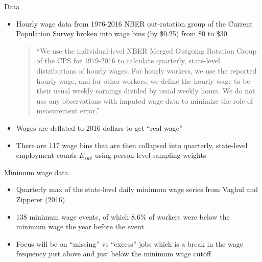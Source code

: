 \documentclass{beamer}
\begin{document}
\begin{frame}{Data}

\begin{itemize}
\item Hourly wage data from 1976-2016 NBER out-rotation group of the Current Population Survey broken into wage bins (by \$0.25) from \$0 to \$30
\begin{quote}
``We use the individual-level NBER Merged Outgoing Rotation Group of the CPS for 1979-2016 to calculate quarterly, state-level distributions of hourly wages. For hourly workers, we use the reported hourly wage, and for other workers, we define the hourly wage to be their usual weekly earnings divided by usual weekly hours.  We do not use any observations with imputed wage data to minimize the role of measurement error.''
\end{quote}
\item Wages are deflated to 2016 dollars to get ``real wage''
\item There are 117 wage bins that are then collapsed into quarterly, state-level employment counts $E_{swt}$ using person-level sampling weights
\end{itemize}

\end{frame}

\begin{frame}{Minimum wage data}

\begin{itemize}
\item Quarterly max of the state-level daily minimum wage series from Vaghul and Zipperer (2016)
\item 138 minimum wage events, of which 8.6\% of workers were below the minimum wage the year before the event
\item Focus will be on ``missing'' vs ``excess'' jobs which is a break in the wage frequency just above and just below the minimum wage cutoff
\end{itemize}

\end{frame}
\end{document}
